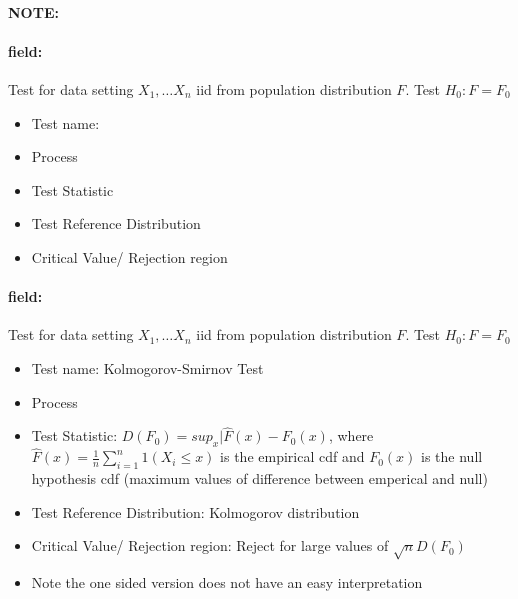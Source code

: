 \documentclass[12pt]{article}
\newenvironment{note}{\paragraph{NOTE:}}{}
\newenvironment{field}{\paragraph{field:}}{}
\begin{document}
\begin{note}
 \begin{field}
  Test for data setting $X_1, \ldots X_n$ iid from population distribution $F$. Test $H_0: F = F_0$
  \begin{itemize}
   \item Test name:
   \item Process
   \item Test Statistic
   \item Test Reference Distribution
   \item Critical Value/ Rejection region
  \end{itemize}
 \end{field}
 \begin{field}
  Test for data setting $X_1, \ldots X_n$ iid from population distribution $F$. Test $H_0: F = F_0$
  \begin{itemize}
   \item Test name: Kolmogorov-Smirnov Test
   \item Process
   \item Test Statistic: $D(F_0) = sup_x|\hat{F}(x) - F_0(x)$, where $\hat{F}(x) = \frac{1}{n}\sum_{i=1}^n 1(X_i \leq x)$ is the empirical cdf and $F_0(x)$ is the null hypothesis cdf (maximum values of difference between emperical and null)
   \item Test Reference Distribution: Kolmogorov distribution
   \item Critical Value/ Rejection region: Reject for large values of $\sqrt{n}D(F_0)$
   \item Note the one sided version does not have an easy interpretation
  \end{itemize}
 \end{field}
\end{note}
\end{document}

